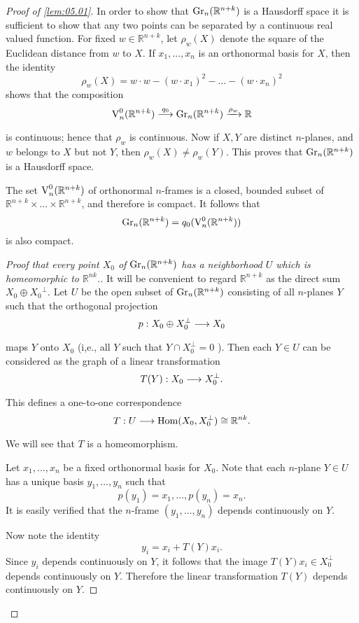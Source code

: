 \documentclass[../main]{subfiles}
\begin{document}
\begin{proof}[Proof of \ref{lem:05.01}]
	In order to show that $\operatorname{Gr}_n (\mathbb{R}^{n+k})$ is a Hausdorff space it is sufficient to show that any two points can be separated by a continuous real valued function. For fixed $w \in \mathbb{R}^{n+k}$, let $\rho_{w}(X)$ denote the square of the Euclidean distance from $w$ to $X$. If $x_{1}, \dots, x_{n}$ is an orthonormal basis for $X$, then the identity
	$$
	\rho_{w}(X)=w \cdot w-(w \cdot x_{1})^{2}-\dots-(w \cdot x_{n})^{2}
	$$
	shows that the composition
	\[
	\StiefelManifold_n^0(\mathbb{R}^{n+k}) \varrightarrow{q_0}\grassmannian_n (\mathbb{R}^{n+k}) \varrightarrow{\rho_w}  \mathbb{R}
	\]
is continuous; hence that $\rho_{w}$ is continuous. Now if $X, Y$ are distinct $n$-planes, and $w$ belongs to $X$ but not $Y$, then $\rho_{w}(X) \neq \rho_{w}(Y)$. This proves that $\operatorname{Gr}_n (\mathbb{R}^{n+k})$ is a Hausdorff space.

The set $\operatorname{V}_n^0(\mathbb{R}^{n+k})$ of orthonormal $n$-frames is a closed, bounded subset of $\mathbb{R}^{n+k} \times \dots \times \mathbb{R}^{n+k}$, and therefore is compact. It follows that
\[\operatorname{Gr}_n (\mathbb{R}^{n+k})=q_{0}(\operatorname{V}_n^0(\mathbb{R}^{n+k}))\]
is also compact.\\
\begin{proof}[Proof that every point $X_{0}$ of $\operatorname{Gr}_n (\mathbb{R}^{n+k})$ has a neighborhood $U$ which is homeomorphic to $\mathbb{R}^{nk}$.]
 It will be convenient to regard $\mathbb{R}^{n+k}$ as the direct sum $X_{0} \oplus X_{0}{ }^\perp$. Let $U$ be the open subset of $\operatorname{Gr}_n (\mathbb{R}^{n+k})$ consisting of all $n$-planes $Y$ such that the orthogonal projection
\[p:X_0\oplus X_{0}^{\perp}\varrightarrow{}X_0\]
maps $Y$ onto $X_{0}$ (i,e., all $Y$ such that $Y \cap X_{0}^{\perp}=0$ ). Then each $Y \in U$ can be considered as the graph of a linear transformation
\[T(Y):X_{0}\varrightarrow{}X_{0}^{\perp}.\]
This defines a one-to-one correspondence
\[T:U \varrightarrow{}\Hom(X_0,X_{0}^{\perp})\cong\mathbb{R}^{nk}.\]
We will see that $T$ is a homeomorphism.

Let $x_{1}, \dots, x_{n}$ be a fixed orthonormal basis for $X_{0}$. Note that each $n$-plane $Y \in U$ has a unique basis $y_{1}, \dots, y_{n}$ such that
\[p(y_{1})=x_{1}, \dots, p(y_{n})=x_{n}.\]
It is easily verified that the $n$-frame $(y_{1}, \dots, y_{n})$ depends continuously on $Y$.

Now note the identity
\[y_{i}=x_{i}+T(Y) x_{i}.\]
Since $y_i$ depends continuously on $Y$, it follows that the image
$T(Y)x_i\in X_0^\perp$ depends continuously on $Y$. Therefore the linear 
transformation $T(Y)$ depends continuously on $Y$.


\end{proof}
\end{proof}
\end{document}
